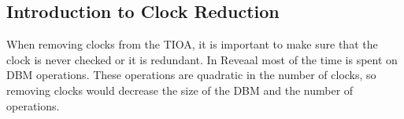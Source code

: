 \subsection{Introduction to Clock Reduction}
When removing clocks from the TIOA, it is important to make sure that the clock is never checked or it is redundant. In Reveaal most of the time is spent on DBM operations. These operations are quadratic in the number of clocks, so removing clocks would decrease the size of the DBM and the number of operations.

